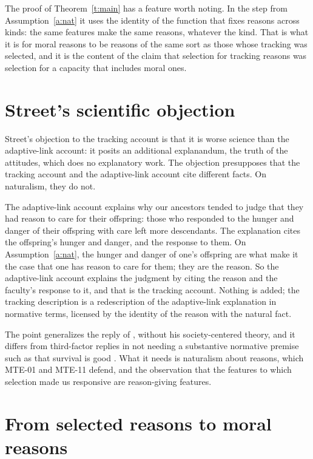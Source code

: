 \documentclass{situationist-preprint}
\begin{document}
The proof of Theorem~\ref{t:main} has a feature worth noting. In the step from Assumption~\ref{a:nat} it uses the identity of the function that fixes reasons across kinds: the same features make the same reasons, whatever the kind. That is what it is for moral reasons to be reasons of the same sort as those whose tracking was selected, and it is the content of the claim that selection for tracking reasons was selection for a capacity that includes moral ones.

\section{Street's scientific objection}

Street's objection to the tracking account is that it is worse science than the adaptive-link account: it posits an additional explanandum, the truth of the attitudes, which does no explanatory work. The objection presupposes that the tracking account and the adaptive-link account cite different facts. On naturalism, they do not.

The adaptive-link account explains why our ancestors tended to judge that they had reason to care for their offspring: those who responded to the hunger and danger of their offspring with care left more descendants. The explanation cites the offspring's hunger and danger, and the response to them. On Assumption~\ref{a:nat}, the hunger and danger of one's offspring are what make it the case that one has reason to care for them; they are the reason. So the adaptive-link account explains the judgment by citing the reason and the faculty's response to it, and that is the tracking account. Nothing is added; the tracking description is a redescription of the adaptive-link explanation in normative terms, licensed by the identity of the reason with the natural fact.

The point generalizes the reply of \citet{Copp2008}, without his society-centered theory, and it differs from third-factor replies in not needing a substantive normative premise such as that survival is good \citep{Enoch2010}. What it needs is naturalism about reasons, which MTE-01 and MTE-11 defend, and the observation that the features to which selection made us responsive are reason-giving features.

\section{From selected reasons to moral reasons}\label{s:extend}
\end{document}
